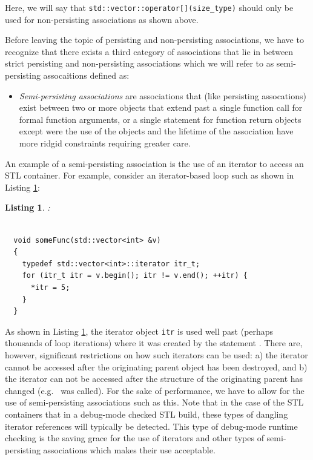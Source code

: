 \documentclass[pdf,ps2pdf,11pt]{SANDreport}
\newtheorem{listing}{Listing}
\begin{document}
Here, we will say that {}\texttt{std::vector::operator[](size\_type)}
should only be used for non-persisting associations as shown above.

Before leaving the topic of persisting and non-persisting
associations, we have to recognize that there exists a third category
of associations that lie in between strict persisting and
non-persisting associations which we will refer to as semi-persisting
assocaitions defined as:

\begin{itemize}

{}\item\textit{Semi-persisting associations} are associations that
(like persisting assocations) exist between two or more objects that
extend past a single function call for formal function arguments, or a
single statement for function return objects except were the use of
the objects and the lifetime of the association have more ridgid
constraints requiring greater care.

\end{itemize}

An example of a semi-persisting association is the use of an iterator
to access an STL container.  For example, consider an iterator-based
loop such as shown in Listing {}\ref{listing:SemiPersistingIterators}:


\begin{listing}:\\
\label{listing:SemiPersistingIterators}
{\small\begin{verbatim}

  void someFunc(std::vector<int> &v)
  {
    typedef std::vector<int>::iterator itr_t;
    for (itr_t itr = v.begin(); itr != v.end(); ++itr) {
      *itr = 5;
    }
  }
\end{verbatim}}
\end{listing}


As shown in Listing {}\ref{listing:SemiPersistingIterators}, the
iterator object {}\texttt{itr} is used well past (perhaps thousands of
loop iterations) where it was created by the statement {}.  There are, however, significant restrictions on how
such iterators can be used: a) the iterator cannot be accessed after
the originating parent object has been destroyed, and b) the iterator
can not be accessed after the structure of the originating parent has
changed (e.g.\ {} was called).  For the sake of
performance, we have to allow for the use of semi-persisting
associations such as this.  Note that in the case of the STL
containers that in a debug-mode checked STL build, these types of
dangling iterator references will typically be detected.  This type of
debug-mode runtime checking is the saving grace for the use of
iterators and other types of semi-persisting associations which makes
their use acceptable.
\end{document}
